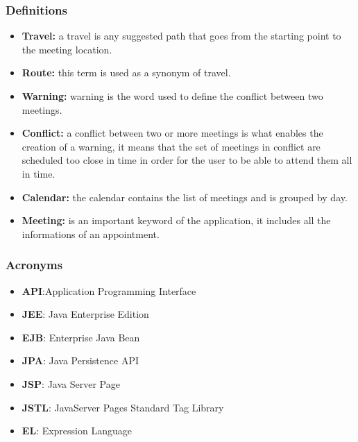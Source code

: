 \subsubsection{Definitions}


\begin{itemize}

\item  \textbf{Travel:} a travel is any suggested path that goes from the starting point to the meeting location.

\item  \textbf{Route:} this term is used as a synonym of travel.

\item  \textbf{Warning:} warning is the word used to define the conflict between two meetings.

\item  \textbf{Conflict:} a conflict between two or more meetings is what enables the creation of a warning, it means that the set of meetings in conflict are scheduled too close in time in order for the user to be able to attend them all in time.

\item  \textbf{Calendar:} the calendar contains the list of meetings and is grouped by day.

\item  \textbf{Meeting:} is an important keyword of the application, it includes all the informations of an appointment.

\end{itemize}


\subsubsection{Acronyms}


\begin{itemize}
	\item \textbf{API}:\@ Application Programming Interface
	
\item \textbf{JEE}: Java Enterprise Edition

\item \textbf{EJB}: Enterprise Java Bean

\item \textbf{JPA}: Java Persistence API

\item \textbf{JSP}: Java Server Page

\item \textbf{JSTL}: JavaServer Pages Standard Tag Library

\item \textbf{EL}: Expression Language

\end{itemize}